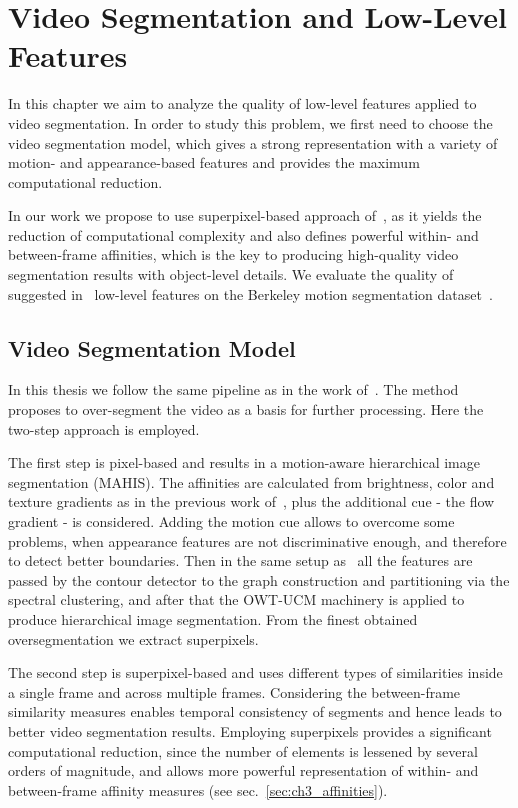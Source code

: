 \chapter{Video Segmentation and Low-Level Features}%
\label{chapter3}
In this chapter we aim to analyze the quality of low-level features applied to video segmentation.
In order to study this problem, we first need to choose the video segmentation model, which gives a strong representation
with a variety of motion- and appearance-based features and provides the maximum computational reduction.%

In our work we propose to use superpixel-based approach of~\cite{GalassoCS12}, as it yields the reduction of computational complexity 
and also defines powerful within- and between-frame affinities, which is the key to producing high-quality video segmentation results with object-level details.
We evaluate the quality of suggested in~\cite{GalassoCS12} low-level features on the Berkeley motion segmentation dataset~\cite{Brox10}.
\section{Video Segmentation Model}%
\label{sec:ch3_framework}
In this thesis we follow the same pipeline as in the work of~\cite{GalassoCS12}. The method proposes to over-segment the video as a basis for further processing. Here the two-step approach is employed. 

The first step is pixel-based and results in a motion-aware hierarchical image segmentation (MAHIS). The affinities
are calculated from brightness, color and texture gradients as in the previous work of~\cite{Arbelaez09}, plus the additional cue - the flow gradient - is considered. Adding the motion cue allows to overcome some problems, when
appearance features are not discriminative enough, and therefore to detect better boundaries. 
Then in the same setup as~\cite{Arbelaez11} all the features 
are passed by the contour detector to the graph construction and partitioning via the spectral clustering, and after that the OWT-UCM machinery is applied to produce hierarchical image segmentation. From the finest obtained 
oversegmentation we extract superpixels. 

The second step is superpixel-based and uses different types of similarities inside a single frame and across multiple frames. Considering the between-frame similarity measures enables temporal consistency of segments and hence leads
to better video segmentation results.
Employing superpixels provides a significant computational reduction, since the number of elements is lessened by several orders of magnitude, and allows more powerful representation of 
within- and between-frame affinity measures (see sec.~\ref{sec:ch3_affinities}).

